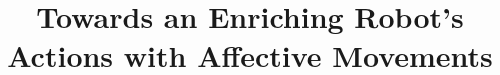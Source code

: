 \documentclass{sig-alternate-05-2015}
\begin{document}



%

\title{Towards an Enriching Robot's Actions with Affective Movements}
%
%
%
%
%
\end{document}
